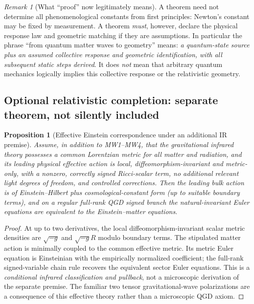 \documentclass[11pt,a4paper]{article}
\newtheorem{proposition}[theorem]{Proposition}
\theoremstyle{remark}\newtheorem{remark}[theorem]{Remark}
\begin{document}
\begin{remark}[What ``proof'' now legitimately means]\label{rem:v30-proof}
A theorem need not determine all phenomenological constants from first principles: Newton's constant may be fixed by measurement. A theorem \emph{must}, however, declare the physical response law and geometric matching if they are assumptions. In particular the phrase ``from quantum matter waves to geometry'' means: \emph{a quantum-state source plus an assumed collective response and geometric identification, with all subsequent static steps derived}. It does \emph{not} mean that arbitrary quantum mechanics logically implies this collective response or the relativistic geometry.
\end{remark}

\subsection{Optional relativistic completion: separate theorem, not silently included}
\begin{proposition}[Effective Einstein correspondence under an additional IR premise]\label{prop:v30-Einstein}
Assume, \emph{in addition to} MW1--MW4, that the gravitational infrared theory possesses a common Lorentzian metric for all matter and radiation, and its leading physical effective action is local, diffeomorphism-invariant and metric-only, with a nonzero, correctly signed Ricci-scalar term, no additional relevant light degrees of freedom, and controlled corrections. Then the leading bulk action is of Einstein--Hilbert plus cosmological-constant form (up to suitable boundary terms), and on a regular full-rank QGD signed branch the natural-invariant Euler equations are equivalent to the Einstein--matter equations.
\end{proposition}
\begin{proof}
At up to two derivatives, the local diffeomorphism-invariant scalar metric densities are $\sqrt{-g}$ and $\sqrt{-g}R$ modulo boundary terms. The stipulated matter action is minimally coupled to the common effective metric. Its metric Euler equation is Einsteinian with the empirically normalized coefficient; the full-rank signed-variable chain rule recovers the equivalent sector Euler equations. This is a \emph{conditional infrared classification and pullback}, not a microscopic derivation of the separate premise. The familiar two tensor gravitational-wave polarizations are a consequence of this effective theory rather than a microscopic QGD axiom.
\end{proof}
\end{document}
